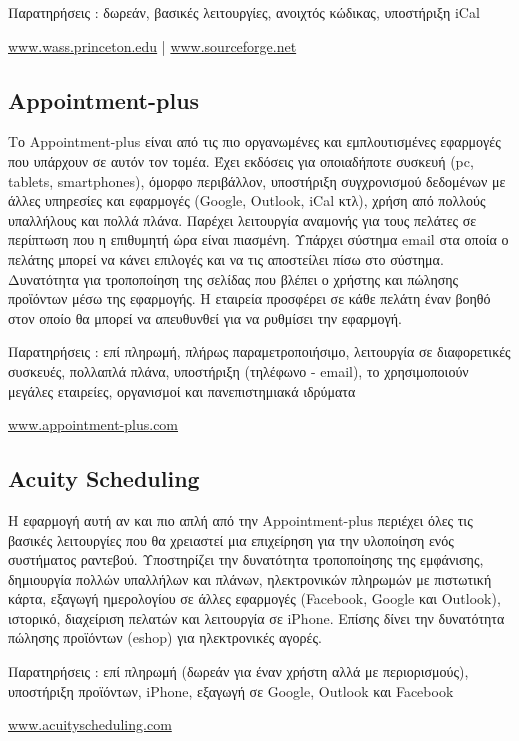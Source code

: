 Παρατηρήσεις : δωρεάν, βασικές λειτουργίες, ανοιχτός κώδικας, υποστήριξη iCal

\href{https://wass.princeton.edu/pages/login.page.php}{www.wass.princeton.edu} |
\href{http://sourceforge.net/projects/wass/}{www.sourceforge.net}

\subsection{Appointment-plus}
Το Appointment-plus είναι από τις πιο οργανωμένες και εμπλουτισμένες εφαρμογές που υπάρχουν σε αυτόν τον τομέα. Έχει εκδόσεις για οποιαδήποτε συσκευή (pc, tablets, smartphones), όμορφο περιβάλλον, υποστήριξη συγχρονισμού δεδομένων με άλλες υπηρεσίες και εφαρμογές (Google, Outlook, iCal κτλ), χρήση από πολλούς υπαλλήλους και πολλά πλάνα. Παρέχει λειτουργία αναμονής για τους πελάτες σε περίπτωση που η επιθυμητή ώρα είναι πιασμένη. Υπάρχει σύστημα email στα οποία ο πελάτης μπορεί να κάνει επιλογές και να τις αποστείλει πίσω στο σύστημα. Δυνατότητα για τροποποίηση της σελίδας που βλέπει ο χρήστης και πώλησης προϊόντων μέσω της εφαρμογής. Η εταιρεία προσφέρει σε κάθε πελάτη έναν βοηθό στον οποίο θα μπορεί να απευθυνθεί για να ρυθμίσει την εφαρμογή. 

Παρατηρήσεις : επί πληρωμή, πλήρως παραμετροποιήσιμο, λειτουργία σε διαφορετικές συσκευές, πολλαπλά πλάνα, υποστήριξη (τηλέφωνο - email), το χρησιμοποιούν μεγάλες εταιρείες, οργανισμοί και πανεπιστημιακά ιδρύματα

\href{http://www.appointment-plus.com/}{www.appointment-plus.com}

\subsection{Acuity Scheduling}
Η εφαρμογή αυτή αν και πιο απλή από την Appointment-plus περιέχει όλες τις βασικές λειτουργίες που θα χρειαστεί μια επιχείρηση για την υλοποίηση ενός συστήματος ραντεβού. Υποστηρίζει την δυνατότητα τροποποίησης της εμφάνισης, δημιουργία πολλών υπαλλήλων και πλάνων, ηλεκτρονικών πληρωμών με πιστωτική κάρτα, εξαγωγή ημερολογίου σε άλλες εφαρμογές (Facebook, Google και Outlook), ιστορικό, διαχείριση πελατών και λειτουργία σε iPhone. Επίσης δίνει την δυνατότητα πώλησης προϊόντων (eshop) για ηλεκτρονικές αγορές.

Παρατηρήσεις : επί πληρωμή (δωρεάν για έναν χρήστη αλλά με περιορισμούς), υποστήριξη προϊόντων, iPhone, εξαγωγή σε Google, Outlook και Facebook

\href{http://www.acuityscheduling.com/}{www.acuityscheduling.com}

